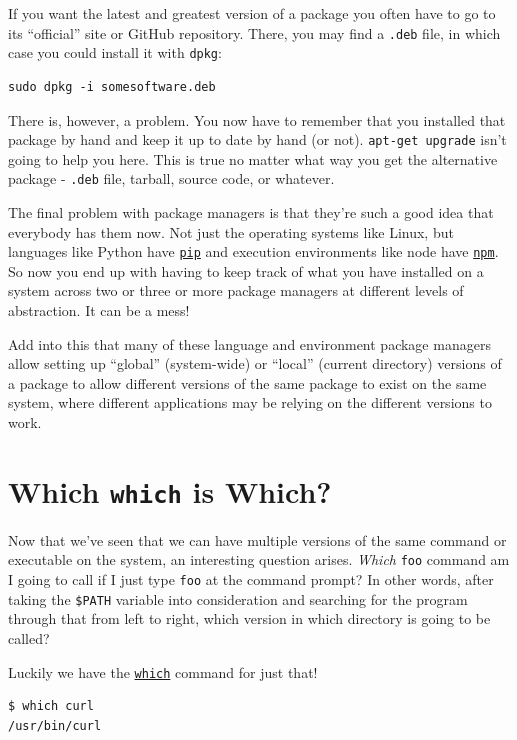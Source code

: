 \documentclass[10pt,]{book}
\numberwithin{figure}{chapter}
\begin{document}
If you want the latest and greatest version of a package you often have
to go to its ``official'' site or GitHub repository. There, you may find
a \texttt{.deb} file, in which case you could install it with
\texttt{dpkg}:

\begin{verbatim}
sudo dpkg -i somesoftware.deb
\end{verbatim}

There is, however, a problem. You now have to remember that you
installed that package by hand and keep it up to date by hand (or not).
\texttt{apt-get upgrade} isn't going to help you here. This is true no
matter what way you get the alternative package - \texttt{.deb} file,
tarball, source code, or whatever.

The final problem with package managers is that they're such a good idea
that everybody has them now. Not just the operating systems like Linux,
but languages like Python have
\href{https://pypi.python.org/pypi/pip/}{\texttt{pip}} and execution
environments like node have \href{https://www.npmjs.com/}{\texttt{npm}}.
So now you end up with having to keep track of what you have installed
on a system across two or three or more package managers at different
levels of abstraction. It can be a mess!

Add into this that many of these language and environment package
managers allow setting up ``global'' (system-wide) or ``local'' (current
directory) versions of a package to allow different versions of the same
package to exist on the same system, where different applications may be
relying on the different versions to work.

\section{Which \texttt{which} is Which?}\label{which-which-is-which}

Now that we've seen that we can have multiple versions of the same
command or executable on the system, an interesting question arises.
\emph{Which} \texttt{foo} command am I going to call if I just type
\texttt{foo} at the command prompt? In other words, after taking the
\texttt{\$PATH} variable into consideration and searching for the
program through that from left to right, which version in which
directory is going to be called?

Luckily we have the
\href{http://linux.die.net/man/1/which}{\texttt{which}} command for just
that!

\begin{verbatim}
$ which curl
/usr/bin/curl
\end{verbatim}
\end{document}
